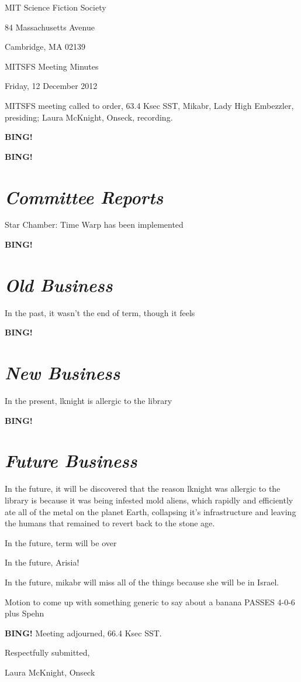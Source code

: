 \documentclass[10pt]{article}
\newcommand{\bing}{{\bf BING!} }
\newcommand{\goto}[1]{\bing \vskip 12pt \section*{{\em{#1}}}}
\newcommand{\ps}{ plus Spehn\xspace}
\newcommand{\onseck}{Laura McKnight, Onseck}
\newcommand{\meetingdate}{Friday, 12 December 2012}
\begin{document}
\begin{center}

MIT Science Fiction Society

84 Massachusetts Avenue

Cambridge, MA 02139

\vspace{12pt}

MITSFS Meeting Minutes

\meetingdate

\end{center}

\vspace{18pt}

\setlength{\parskip}{6pt}

\noindent
MITSFS meeting called to order, 63.4 Ksec SST,
Mikabr, Lady High Embezzler, presiding; \onseck, recording.

\bing

\goto{Committee Reports}

Star Chamber: Time Warp has been implemented

\goto{Old Business}

In the past, it wasn't the end of term, though it feels 

\goto{New Business}

In the present, lknight is allergic to the library

\goto{Future Business}

In the future, it will be discovered that the reason lknight was allergic to the library is because it was being infested mold aliens, which rapidly and efficiently ate all of the metal on the planet Earth, collapsing it's infrastructure and leaving the humans that remained to revert back to the stone age. 

In the future, term will be over

In the future, Arisia!

In the future, mikabr will miss all of the things because she will be in Israel.

Motion to come up with something generic to say about a banana PASSES 4-0-6 \ps

\bing
\noindent
Meeting adjourned, 66.4 Ksec SST.

\vspace{18pt}

\centerline{Respectfully submitted,}
\centerline{\onseck}
\end{document}
